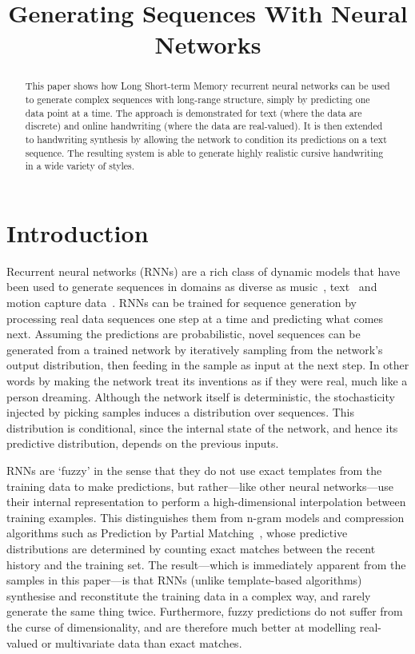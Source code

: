 \title{Generating Sequences With Neural Networks}

\begin{abstract}
This paper shows how Long Short-term Memory recurrent neural networks can be used to generate complex sequences with long-range structure, simply by predicting one data point at a time. The approach is demonstrated for text (where the data are discrete) and online handwriting (where the data are real-valued). It is then extended to handwriting synthesis by allowing the network to condition its predictions on a text sequence. The resulting system is able to generate highly realistic cursive handwriting in a wide variety of styles.
\end{abstract}

\section{Introduction}

Recurrent neural networks (RNNs) are a rich class of dynamic models that have been used to generate sequences in domains as diverse as music~\cite{eck02music,boulanger12music}, text~\cite{sutskever11rnn} and motion capture data~\cite{sutskever08rtbm}. RNNs can be trained for sequence generation by processing real data sequences one step at a time and  predicting what comes next. Assuming the predictions are probabilistic, novel sequences can be generated from a trained network by iteratively sampling from the network's output distribution, then feeding in the sample as input at the next step. In other words by making the network treat its inventions as if they were real, much like a person dreaming. Although the network itself is deterministic, the stochasticity injected by picking samples induces a distribution over sequences. This distribution is conditional, since the internal state of the network, and hence its predictive distribution, depends on the previous inputs.

RNNs are `fuzzy' in the sense that they do not use exact templates from the training data to make predictions, but rather---like other neural networks---use their internal representation to perform a high-dimensional interpolation between training examples. This distinguishes them from n-gram models and compression algorithms such as Prediction by Partial Matching~\cite{cleary84ppm}, whose predictive distributions are determined by counting exact matches between the recent history and the training set. The result---which is immediately apparent from the samples in this paper---is that RNNs (unlike template-based algorithms) synthesise and reconstitute the training data in a complex way, and rarely generate the same thing twice. Furthermore, fuzzy predictions do not suffer from the curse of dimensionality, and are therefore much better at modelling real-valued or multivariate data than exact matches.

